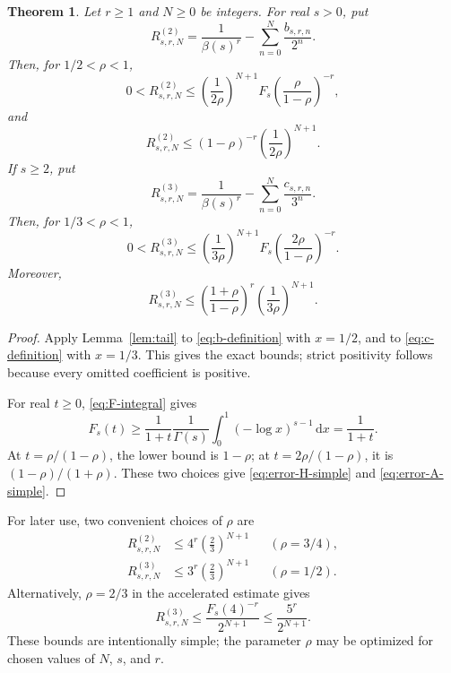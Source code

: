 \documentclass[11pt,reqno]{amsart}
\numberwithin{equation}{section}
\newtheorem{theorem}{Theorem}[section]
\theoremstyle{definition}
\theoremstyle{remark}
\newcommand{\dd}{\,\mathrm{d}}
\begin{document}
\begin{theorem}\label{thm:error-bounds}
Let \(r\geq1\) and \(N\geq0\) be integers.  For real \(s>0\), put
\[
 R_{s,r,N}^{(2)}
 =
 \frac1{\beta(s)^r}
 -
 \sum_{n=0}^{N}\frac{b_{s,r,n}}{2^n}.
\]
Then, for \(1/2<\rho<1\),
\begin{equation}\label{eq:error-H-exact}
 0<R_{s,r,N}^{(2)}
 \leq
 \left(\frac1{2\rho}\right)^{N+1}
 F_s\!\left(\frac{\rho}{1-\rho}\right)^{-r},
\end{equation}
and
\begin{equation}\label{eq:error-H-simple}
 R_{s,r,N}^{(2)}
 \leq
 (1-\rho)^{-r}
 \left(\frac1{2\rho}\right)^{N+1}.
\end{equation}
If \(s\geq2\), put
\[
 R_{s,r,N}^{(3)}
 =
 \frac1{\beta(s)^r}
 -
 \sum_{n=0}^{N}\frac{c_{s,r,n}}{3^n}.
\]
Then, for \(1/3<\rho<1\),
\begin{equation}\label{eq:error-A-exact}
 0<R_{s,r,N}^{(3)}
 \leq
 \left(\frac1{3\rho}\right)^{N+1}
 F_s\!\left(\frac{2\rho}{1-\rho}\right)^{-r}.
\end{equation}
Moreover,
\begin{equation}\label{eq:error-A-simple}
 R_{s,r,N}^{(3)}
 \leq
 \left(\frac{1+\rho}{1-\rho}\right)^r
 \left(\frac1{3\rho}\right)^{N+1}.
\end{equation}
\end{theorem}

\begin{proof}
Apply Lemma~\ref{lem:tail} to \eqref{eq:b-definition} with
\(x=1/2\), and to \eqref{eq:c-definition} with \(x=1/3\).  This gives
the exact bounds; strict positivity follows because every omitted
coefficient is positive.

For real \(t\geq0\), \eqref{eq:F-integral} gives
\[
 F_s(t)\geq\frac1{1+t}
 \frac1{\Gamma(s)}
 \int_0^1(-\log x)^{s-1}\dd x
 =\frac1{1+t}.
\]
At \(t=\rho/(1-\rho)\), the lower bound is \(1-\rho\); at
\(t=2\rho/(1-\rho)\), it is \((1-\rho)/(1+\rho)\).  These two choices
give \eqref{eq:error-H-simple} and \eqref{eq:error-A-simple}.
\end{proof}

For later use, two convenient choices of \(\rho\) are
\begin{align}
 R_{s,r,N}^{(2)}
 &\leq4^r\left(\frac23\right)^{N+1}
 &&(\rho=3/4), \label{eq:error-H-concrete}\\
 R_{s,r,N}^{(3)}
 &\leq3^r\left(\frac23\right)^{N+1}
 &&(\rho=1/2). \label{eq:error-A-concrete}
\end{align}
Alternatively, \(\rho=2/3\) in the accelerated estimate gives
\begin{equation}\label{eq:error-A-half}
 R_{s,r,N}^{(3)}
 \leq
 \frac{F_s(4)^{-r}}{2^{N+1}}
 \leq\frac{5^r}{2^{N+1}}.
\end{equation}
These bounds are intentionally simple; the parameter \(\rho\) may be
optimized for chosen values of \(N\), \(s\), and \(r\).
\end{document}
